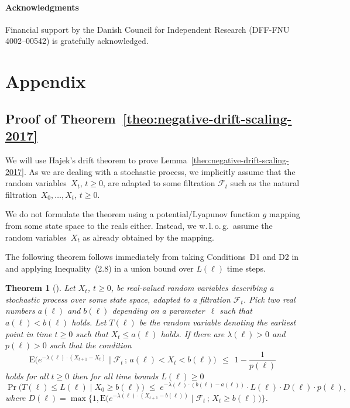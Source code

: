 \documentclass[11pt, a4paper]{article}
\newtheorem{theorem}{Theorem}
\DeclareMathOperator{\Prob}{Pr}
\newcommand*{\E}{\mathrm{E}}
\newcommand{\wlo}{w.\,l.\,o.\,g.\xspace}
\newcommand{\filtt}{\mathcal{F}_t}
\begin{document}
\paragraph{Acknowledgments} 
Financial support by the Danish Council for Independent Research 
(DFF-FNU 4002--00542) is gratefully acknowledged.

 



\appendix
\section{Appendix}





\subsection{Proof of Theorem~\ref{theo:negative-drift-scaling-2017}}



We will use Hajek's drift 
theorem to prove  Lemma~\ref{theo:negative-drift-scaling-2017}.  
As we are dealing with a stochastic process, we 
implicitly assume that the random variables~$X_t$, $t\ge 0$,  
are adapted to some filtration $\filtt$ such as the natural filtration~$X_0,\dots,X_t$, $t\ge 0$.

We do not formulate the theorem using a potential/Lyapunov function $g$ 
mapping from some state space to the reals either. Instead,  
we \wlo\ assume the random variables~$X_t$ as already obtained by the 
mapping.

The following theorem follows immediately from taking Conditions~D1 and D2 in \cite{Hajek1982} 
and applying Inequality~(2.8) in a union bound over $L(\ell)$ time steps.

\begin{theorem}[\cite{Hajek1982}]
  \label{theo:orig-drift}
  Let $X_t$, $t\ge 0$, be real-valued random variables describing a
	stochastic process over some state space, adapted to a filtration $\filtt$. Pick two
  real numbers $a(\ell)$ and $b(\ell)$ depending on a parameter~$\ell$
  such that $a(\ell)<b(\ell)$ holds. Let $T(\ell)$ be the random
  variable denoting the earliest point in time $t\ge 0$ such that
  $X_t\le a(\ell)$ holds.  If there are $\lambda(\ell)>0$ and
  $p(\ell)>0$ such that the condition
  \begin{equation}
  \label{eq:maindriftcondition}
  \tag{$\ast$}
  \E\bigl(e^{-\lambda(\ell)\cdot (X_{t+1}-X_t)}
     \mid \filtt \,;\, a(\ell)<  X_t < b(\ell)\bigr)
  \;\,\le\,\; 1-\frac{1}{p(\ell)}  
  \end{equation}
  holds for all $t\ge 0$ then for all time bounds $L(\ell)\ge 0$
  \[
  \Prob\bigl(T(\ell)\le L(\ell) \mid X_0\ge b(\ell)\bigr) 
  \;\le\; e^{-\lambda(\ell)\cdot
    (b(\ell)-a(\ell))}\cdot L(\ell)\cdot D(\ell)\cdot p(\ell),
  \]
  where $D(\ell)=\max\bigl\{1,\E\bigl(e^{-\lambda(\ell)\cdot (X_{t+1}-b(\ell))}\mid \filtt \,;\, X_t\ge b(\ell)\bigr)\bigr\}$.
\end{theorem}
\end{document}
